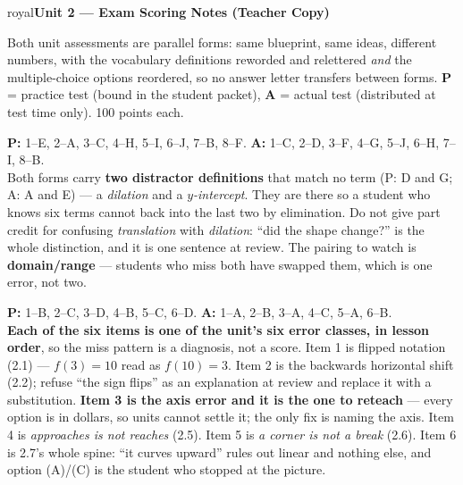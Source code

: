 \documentclass[10pt]{article}
\begin{document}


\newpage

\begin{headlinebox}{royal}{\color{white}\bfseries Unit 2 --- Exam Scoring Notes (Teacher Copy)}\end{headlinebox}

\vspace{4pt}
\noindent\footnotesize
Both unit assessments are parallel forms: same blueprint, same ideas, different numbers, with the
vocabulary definitions reworded and relettered \emph{and} the multiple-choice options reordered, so
no answer letter transfers between forms. \textbf{P} = practice test (bound in the student packet),
\textbf{A} = actual test (distributed at test time only). 100 points each.

\vspace{4pt}

\boxguard[10]
\begin{teachernote}
\footnotesize
\textbf{P:} 1--E, 2--A, 3--C, 4--H, 5--I, 6--J, 7--B, 8--F. \qquad
\textbf{A:} 1--C, 2--D, 3--F, 4--G, 5--J, 6--H, 7--I, 8--B.\\[2pt]
Both forms carry \textbf{two distractor definitions} that match no term (P: D and G; A: A and E) ---
a \emph{dilation} and a \emph{$y$-intercept}. They are there so a student who knows six terms cannot
back into the last two by elimination. Do not give part credit for confusing \emph{translation} with
\emph{dilation}: ``did the shape change?'' is the whole distinction, and it is one sentence at review.
The pairing to watch is \textbf{domain/range} --- students who miss both have swapped them, which is
one error, not two.
\end{teachernote}

\boxguard[10]
\begin{teachernote}
\footnotesize
\textbf{P:} 1--B, 2--C, 3--D, 4--B, 5--C, 6--D. \qquad \textbf{A:} 1--A, 2--B, 3--A, 4--C, 5--A, 6--B.\\[2pt]
\textbf{Each of the six items is one of the unit's six error classes, in lesson order}, so the miss
pattern is a diagnosis, not a score. Item 1 is flipped notation (2.1) --- $f(3)=10$ read as $f(10)=3$.
Item 2 is the backwards horizontal shift (2.2); refuse ``the sign flips'' as an explanation at review
and replace it with a substitution. \textbf{Item 3 is the axis error and it is the one to reteach} ---
every option is in dollars, so units cannot settle it; the only fix is naming the axis. Item 4 is
\emph{approaches is not reaches} (2.5). Item 5 is \emph{a corner is not a break} (2.6). Item 6 is
2.7's whole spine: ``it curves upward'' rules out linear and nothing else, and option (A)/(C) is the
student who stopped at the picture.
\end{teachernote}
\end{document}
